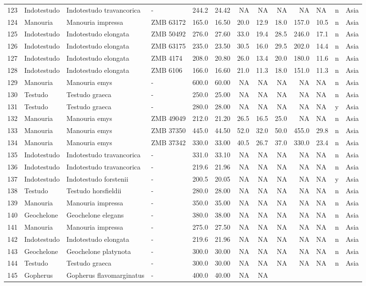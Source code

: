 \begin{landscape}
{\begin{longtable}[]{@{}llllrrrrrrlll@{}}
	123 & Indotestudo & Indotestudo travancorica & - & 244.2 & 24.42 & NA &
	NA & NA & NA & NA & n & Asia\tabularnewline
	124 & Manouria & Manouria impressa & ZMB 63172 & 165.0 & 16.50 & 20.0 &
	12.9 & 18.0 & 157.0 & 10.5 & n & Asia\tabularnewline
	125 & Indotestudo & Indotestudo elongata & ZMB 50492 & 276.0 & 27.60 &
	33.0 & 19.4 & 28.5 & 246.0 & 17.1 & n & Asia\tabularnewline
	126 & Indotestudo & Indotestudo elongata & ZMB 63175 & 235.0 & 23.50 &
	30.5 & 16.0 & 29.5 & 202.0 & 14.4 & n & Asia\tabularnewline
	127 & Indotestudo & Indotestudo elongata & ZMB 4174 & 208.0 & 20.80 &
	26.0 & 13.4 & 20.0 & 180.0 & 11.6 & n & Asia\tabularnewline
	128 & Indotestudo & Indotestudo elongata & ZMB 6106 & 166.0 & 16.60 &
	21.0 & 11.3 & 18.0 & 151.0 & 11.3 & n & Asia\tabularnewline
	129 & Manouria & Manouria emys & - & 600.0 & 60.00 & NA & NA & NA & NA &
	NA & n & Asia\tabularnewline
	130 & Testudo & Testudo graeca & - & 250.0 & 25.00 & NA & NA & NA & NA &
	NA & n & Asia\tabularnewline
	131 & Testudo & Testudo graeca & - & 280.0 & 28.00 & NA & NA & NA & NA &
	NA & y & Asia\tabularnewline
	132 & Manouria & Manouria emys & ZMB 49049 & 212.0 & 21.20 & 26.5 & 16.5
	& 25.0 & NA & NA & n & Asia\tabularnewline
	133 & Manouria & Manouria emys & ZMB 37350 & 445.0 & 44.50 & 52.0 & 32.0
	& 50.0 & 455.0 & 29.8 & n & Asia\tabularnewline
	134 & Manouria & Manouria emys & ZMB 37342 & 330.0 & 33.00 & 40.5 & 26.7
	& 37.0 & 330.0 & 23.4 & n & Asia\tabularnewline
	135 & Indotestudo & Indotestudo travancorica & - & 331.0 & 33.10 & NA &
	NA & NA & NA & NA & n & Asia\tabularnewline
	136 & Indotestudo & Indotestudo travancorica & - & 219.6 & 21.96 & NA &
	NA & NA & NA & NA & n & Asia\tabularnewline
	137 & Indotestudo & Indotestudo forstenii & - & 200.5 & 20.05 & NA & NA
	& NA & NA & NA & y & Asia\tabularnewline
	138 & Testudo & Testudo horsfieldii & - & 280.0 & 28.00 & NA & NA & NA &
	NA & NA & n & Asia\tabularnewline
	139 & Manouria & Manouria impressa & - & 350.0 & 35.00 & NA & NA & NA &
	NA & NA & n & Asia\tabularnewline
	140 & Geochelone & Geochelone elegans & - & 380.0 & 38.00 & NA & NA & NA
	& NA & NA & n & Asia\tabularnewline
	141 & Manouria & Manouria impressa & - & 275.0 & 27.50 & NA & NA & NA &
	NA & NA & n & Asia\tabularnewline
	142 & Indotestudo & Indotestudo elongata & - & 219.6 & 21.96 & NA & NA &
	NA & NA & NA & n & Asia\tabularnewline
	143 & Geochelone & Geochelone platynota & - & 300.0 & 30.00 & NA & NA &
	NA & NA & NA & n & Asia\tabularnewline
	144 & Testudo & Testudo graeca & - & 300.0 & 30.00 & NA & NA & NA & NA &
	NA & n & Asia\tabularnewline
	145 & Gopherus & Gopherus flavomarginatus & - & 400.0 & 40.00 & NA & NA

\end{longtable}}
\end{landscape}
